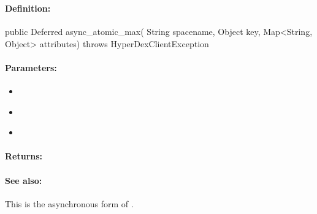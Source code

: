 \pagebreak
\subsubsection{}
\label{api:java:async_atomic_max}


\paragraph{Definition:}
\begin{javacode}
public Deferred async_atomic_max(
        String spacename,
        Object key,
        Map<String, Object> attributes) throws HyperDexClientException
\end{javacode}

\paragraph{Parameters:}
\begin{itemize}[noitemsep]
\item {}\\

\item {}\\

\item {}\\

\end{itemize}

\paragraph{Returns:}


\paragraph{See also:}  This is the asynchronous form of .

\pagebreak
\subsubsection{}
\label{api:java:cond_atomic_max}


